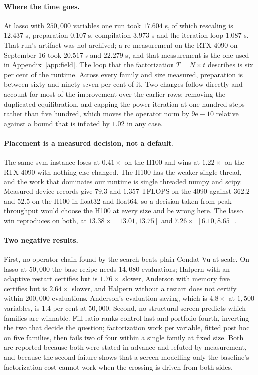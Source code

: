 \documentclass[11pt]{article}
\begin{document}
\paragraph{Where the time goes.} At lasso with $250{,}000$ variables one run took
$17.604$ s, of which rescaling is $12.437$ s, preparation $0.107$ s,
compilation $3.973$ s and the iteration loop $1.087$ s. That run's artifact was
not archived; a re-measurement on the RTX 4090 on September 16 took $20.517$ s
and $22.279$ s, and that measurement is the one used in Appendix~\ref{app:field}. The loop that the
factorization $T = N \times t$ describes is six per cent of the runtime.
Across every family and size measured, preparation is between sixty and ninety
seven per cent of it. Two changes follow directly and account for most of the
improvement over the earlier rows: removing the duplicated equilibration, and
capping the power iteration at one hundred steps rather than five hundred,
which moves the operator norm by $9\mathrm{e}{-}10$ relative against a bound
that is inflated by $1.02$ in any case.

\paragraph{Placement is a measured decision, not a default.} The same svm
instance loses at $0.41\times$ on the H100 and wins at $1.22\times$ on the RTX
4090 with nothing else changed. The H100 has the weaker single thread, and the
work that dominates our runtime is single threaded numpy and scipy. Measured
device records give $79.3$ and $1.357$ TFLOPS on the 4090 against $362.2$ and
$52.5$ on the H100 in float32 and float64, so a decision taken from peak
throughput would choose the H100 at every size and be wrong here. The lasso
win reproduces on both, at $13.38\times$ $[13.01, 13.75]$ and $7.26\times$
$[6.10, 8.65]$.

\paragraph{Two negative results.} First, no operator chain found by the search
beats plain Condat-Vu at scale. On lasso at $50{,}000$ the base recipe needs
$14{,}080$ evaluations; Halpern with an adaptive restart certifies but is
$1.76\times$ slower, Anderson with memory five certifies but is $2.64\times$
slower, and Halpern without a restart does not certify within $200{,}000$
evaluations. Anderson's evaluation saving, which is $4.8\times$ at $1{,}500$
variables, is $1.4$ per cent at $50{,}000$. Second, no structural screen
predicts which families are winnable. Fill ratio ranks control last and
portfolio fourth, inverting the two that decide the question; factorization
work per variable, fitted post hoc on five families, then fails two of four
within a single family at fixed size. Both are reported because both were
stated in advance and refuted by measurement, and because the second failure
shows that a screen modelling only the baseline's factorization cost cannot
work when the crossing is driven from both sides.
\end{document}

